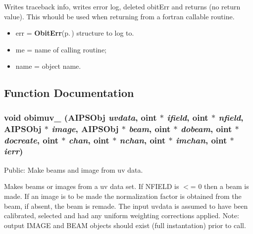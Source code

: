 Writes traceback info, writes error log, deleted obit\-Err and returns (no return value). This whould be used when returning from a fortran callable routine. \begin{itemize}
\item err = {\bf Obit\-Err}{\rm (p.\,\pageref{structObitErr})} structure to log to. \item me = name of calling routine; \item name = object name. \end{itemize}


\subsection{Function Documentation}
\subsubsection{\setlength{\rightskip}{0pt plus 5cm}void obimuv\_\- ({\bf AIPSObj} {\em uvdata}, {\bf oint} $\ast$ {\em ifield}, {\bf oint} $\ast$ {\em nfield}, {\bf AIPSObj} $\ast$ {\em image}, {\bf AIPSObj} $\ast$ {\em beam}, {\bf oint} $\ast$ {\em dobeam}, {\bf oint} $\ast$ {\em docreate}, {\bf oint} $\ast$ {\em chan}, {\bf oint} $\ast$ {\em nchan}, {\bf oint} $\ast$ {\em imchan}, {\bf oint} $\ast$ {\em ierr})}\label{ObitAIPSFortran_8c_a8}


Public: Make beams and image from uv data. 

Makes beams or images from a uv data set. If NFIELD is $<$= 0 then a beam is made. If an image is to be made the normalization factor is obtained from the beam, if absent, the beam is remade. The input uvdata is assumed to have been calibrated, selected and had any uniform weighting corrections applied. Note: output IMAGE and BEAM objects should exist (full instantation) prior to call.

